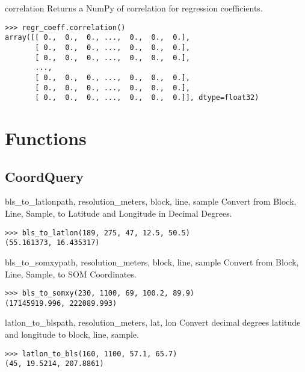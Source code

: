 \documentclass{howto}
\begin{document}
\begin{methoddesc}{correlation}{}
  Returns a NumPy of correlation for regression coefficients.

\begin{verbatim}
>>> regr_coeff.correlation()
array([[ 0.,  0.,  0., ...,  0.,  0.,  0.],
       [ 0.,  0.,  0., ...,  0.,  0.,  0.],
       [ 0.,  0.,  0., ...,  0.,  0.,  0.],
       ...,
       [ 0.,  0.,  0., ...,  0.,  0.,  0.],
       [ 0.,  0.,  0., ...,  0.,  0.,  0.],
       [ 0.,  0.,  0., ...,  0.,  0.,  0.]], dtype=float32)
\end{verbatim}
\end{methoddesc}

\section{Functions \label {funcs}}

\subsection{CoordQuery \label{coordquery}}

\begin{funcdesc}{bls_to_latlon}{path, resolution_meters, block, line, sample}
  Convert from Block, Line, Sample, to Latitude and Longitude in Decimal Degrees.

\begin{verbatim}
>>> bls_to_latlon(189, 275, 47, 12.5, 50.5)
(55.161373, 16.435317)
\end{verbatim}
\end{funcdesc}

\begin{funcdesc}{bls_to_somxy}{path, resolution_meters, block, line, sample}
  Convert from Block, Line, Sample, to SOM Coordinates.

\begin{verbatim}
>>> bls_to_somxy(230, 1100, 69, 100.2, 89.9)
(17145919.996, 222089.993)
\end{verbatim}
\end{funcdesc}

\begin{funcdesc}{latlon_to_bls}{path, resolution_meters, lat, lon}
  Convert decimal degrees latitude and longitude to block, line, sample.

\begin{verbatim}
>>> latlon_to_bls(160, 1100, 57.1, 65.7)
(45, 19.5214, 207.8861)
\end{verbatim}
\end{funcdesc}
\end{document}
